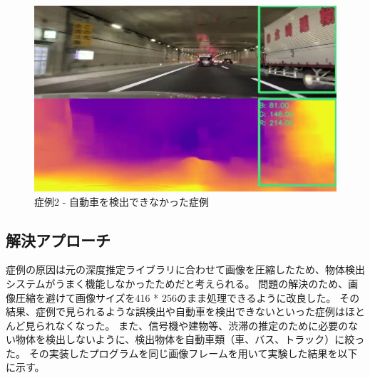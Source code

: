 \begin{figure}[hbtp]
 \begin{center}
  \includegraphics[width=12cm]{figs/miss_2.png}
 \end{center}
  \caption{症例2 - 自動車を検出できなかった症例}
  \label{fig:miss2}
\end{figure}

\newpage

\subsection{解決アプローチ}
症例の原因は元の深度推定ライブラリに合わせて画像を圧縮したため、物体検出システムがうまく機能しなかったためだと考えられる。
問題の解決のため、画像圧縮を避けて画像サイズを416 * 256のまま処理できるように改良した。
その結果、症例で見られるような誤検出や自動車を検出できないといった症例はほとんど見られなくなった。
また、信号機や建物等、渋滞の推定のために必要のない物体を検出しないように、検出物体を自動車類（車、バス、トラック）に絞った。
その実装したプログラムを同じ画像フレームを用いて実験した結果を以下に示す。

